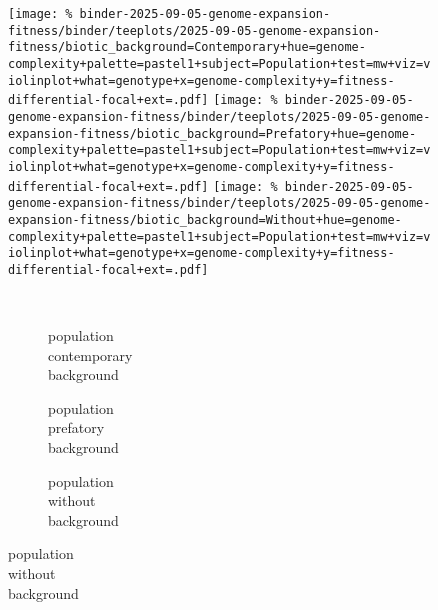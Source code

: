 \begin{figure}
\begin{minipage}{\linewidth}
\texttt{[image: \%
binder-2025-09-05-genome-expansion-fitness/binder/teeplots/2025-09-05-genome-expansion-fitness/biotic\_background=Contemporary+hue=genome-complexity+palette=pastel1+subject=Population+test=mw+viz=violinplot+what=genotype+x=genome-complexity+y=fitness-differential-focal+ext=.pdf]}
\texttt{[image: \%
binder-2025-09-05-genome-expansion-fitness/binder/teeplots/2025-09-05-genome-expansion-fitness/biotic\_background=Prefatory+hue=genome-complexity+palette=pastel1+subject=Population+test=mw+viz=violinplot+what=genotype+x=genome-complexity+y=fitness-differential-focal+ext=.pdf]}%
\texttt{[image: \%
binder-2025-09-05-genome-expansion-fitness/binder/teeplots/2025-09-05-genome-expansion-fitness/biotic\_background=Without+hue=genome-complexity+palette=pastel1+subject=Population+test=mw+viz=violinplot+what=genotype+x=genome-complexity+y=fitness-differential-focal+ext=.pdf]}

\vspace{-1ex}

\begin{subfigure}{0.135\linewidth}
~
\end{subfigure}%
\begin{subfigure}{0.305\linewidth}
    \centering
    \caption{\footnotesize population\\contemporary\\background}
    \label{fig:fitness-gcomplexity:population-contemporary}
\end{subfigure}%
\begin{subfigure}{0.305\linewidth}
    \centering
    \caption{\footnotesize population\\prefatory\\background}
    \label{fig:fitness-gcomplexity:population-prefatory}
\end{subfigure}%
\begin{subfigure}{0.255\linewidth}
    \centering
    \caption{\footnotesize population\\without\\background}
    \label{fig:fitness-gcomplexity:population-without}
\end{subfigure}
\end{minipage}



\end{figure}
